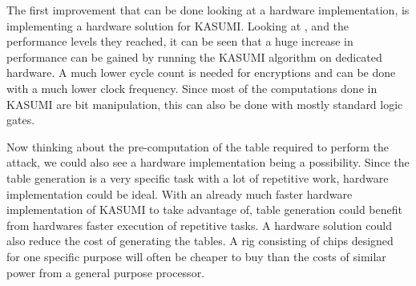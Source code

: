 The first improvement that can be done looking at a hardware
implementation, is implementing a hardware solution for
KASUMI. Looking at \cite{hwkas}, and the
performance levels they reached, it can be seen that a huge increase
in performance can be gained by running the KASUMI algorithm on
dedicated hardware. A much lower cycle count is needed for encryptions
and can be done with a much lower clock frequency. Since most of the
computations done in KASUMI are bit manipulation, this can also be done
with mostly standard logic gates. 

Now thinking about the pre-computation of the table required to
perform the attack, we could also see a hardware implementation being
a possibility. Since the table generation is a very specific task with
a lot of repetitive work, hardware implementation could be ideal. With
an already much faster hardware implementation of KASUMI to take
advantage of, table generation could benefit from hardwares faster
execution of repetitive tasks. A hardware solution could also reduce
the cost of generating the tables. A rig consisting of chips designed for one specific
purpose will often be cheaper to buy than the costs of similar power
from a general purpose processor.

